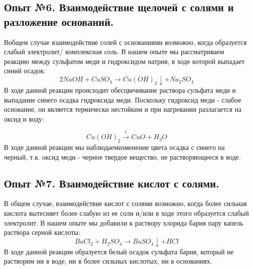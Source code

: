 \documentclass[a4paper, 12pt]{article}
\begin{document}
\subsection{Опыт №6. Взаимодействие щелочей с солями и разложение оснований.}
Вобщем  случае взаимодействие солей с основаниями возможно, когда образуется слабый электролит/ комплексная соль. В нашем опыте мы рассматриваем реакцию между сульфатом меди и гидроксидом натрия, в ходе которой выпадает синий осадок:
\begin{equation}
    2NaOH + CuSO_4 \xrightarrow{} Cu(OH)_2 \downarrow + Na_2 SO_4
\end{equation}
В ходе данной реакции происходит обесцвечивание раствора сульфата меди и выпадание синего осадка гидроксида меди. Поскольку гидроксид меди - слабое основание, он является термически нестойким и при нагревании разлагается на оксид и воду:

\begin{equation}
    Cu(OH)_2 \xrightarrow{t} CuO + H_2 O
\end{equation}
В ходе данной реакции мы наблюдаемизменение цвета осадка с синего на черный, т.к. оксид меди - черное твердое вещество, не растворяющееся в воде.
\subsection{Опыт №7. Взаимодействие кислот с солями.}
В общем случае, взаимодействие кислот с солями возможно, когда более сильная кислота вытесняет более слабую из ее соли и/или в ходе этого образуется слабый электролит. В нашем опыте мы добавили к раствору хлорида бария пару капель раствора серной кислоты:
\begin{equation}
    BaCl_2 + H_2 SO_4 \xrightarrow{} BaSO_4\downarrow + HCl
\end{equation}
В ходе данной реакции образуется белый осадок сульфата бария, который не растворим ни в воде, ни в более сильных кислотых, ни в основаниях.
\end{document}
